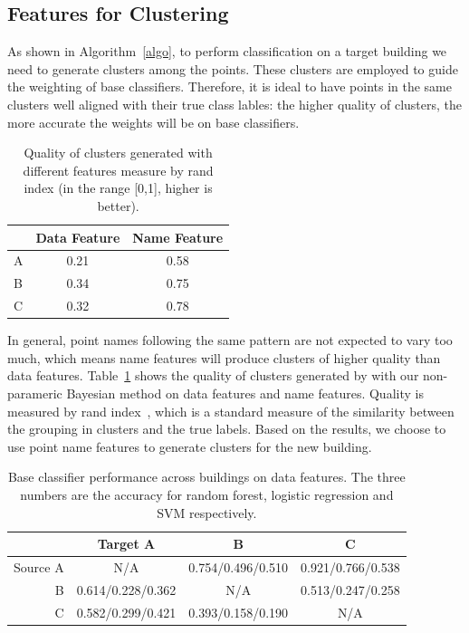 \subsection{Features for Clustering}
As shown in Algorithm~\ref{algo}, to perform classification on a target building we need to generate clusters among the points.
These clusters are employed to guide the weighting of base classifiers. Therefore, it is ideal to have points in the same clusters 
well aligned with their true class lables: the higher quality of clusters, the more accurate the weights will be on base classifiers.


\begin{table}[h]
\centering
\begin{tabular}{l|c|c}
\hline
                & Data Feature & Name Feature \\ \hline
A & 0.21       & 0.58       \\
B & 0.34       & 0.75       \\
C & 0.32       & 0.78       \\ \hline
\end{tabular}
\caption{Quality of clusters generated with different features measure by rand index (in the range [0,1], higher is better).}
\label{quality}
\end{table}


In general, point names following the same pattern are not expected to vary too much, which means name features will produce clusters of higher quality than data features.
Table~\ref{quality} shows the quality of clusters generated by with our non-parameric Bayesian method on data features and name features. 
Quality is measured by rand index~\cite{rand}, which is a standard measure of the similarity between the grouping in clusters and the true labels.
Based on the results, we choose to use point name features to generate clusters for the new building. 


\begin{table}[]
\centering
\begin{tabular}{r|c|c|c}
\hline
 & Target A     & B     & C     \\ \hline
Source A & N/A   & 0.754/0.496/0.510 & 0.921/0.766/0.538 \\ \hline
B & 0.614/0.228/0.362 & N/A   & 0.513/0.247/0.258 \\ \hline
C & 0.582/0.299/0.421 & 0.393/0.158/0.190 & N/A   \\ \hline
\end{tabular}
\caption{Base classifier performance across buildings on data features. The three numbers are the accuracy for random forest, logistic regression and SVM respectively.}
\label{acc_base}
\end{table}


